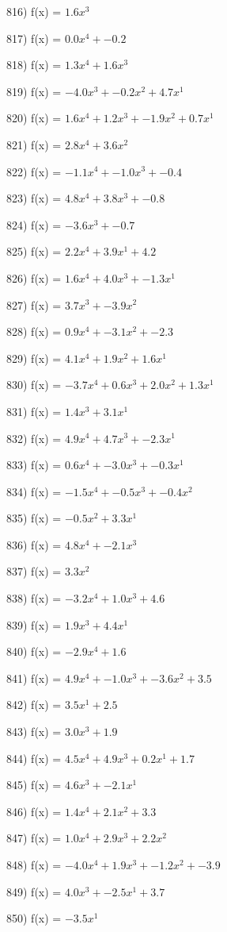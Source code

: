 \documentclass[10pt,a4paper]{article}
\begin{document}
816) f(x) = $1.6x^3$

817) f(x) = $0.0x^4 + -0.2$

818) f(x) = $1.3x^4 + 1.6x^3$

819) f(x) = $-4.0x^3 + -0.2x^2 + 4.7x^1$

820) f(x) = $1.6x^4 + 1.2x^3 + -1.9x^2 + 0.7x^1$

821) f(x) = $2.8x^4 + 3.6x^2$

822) f(x) = $-1.1x^4 + -1.0x^3 + -0.4$

823) f(x) = $4.8x^4 + 3.8x^3 + -0.8$

824) f(x) = $-3.6x^3 + -0.7$

825) f(x) = $2.2x^4 + 3.9x^1 + 4.2$

826) f(x) = $1.6x^4 + 4.0x^3 + -1.3x^1$

827) f(x) = $3.7x^3 + -3.9x^2$

828) f(x) = $0.9x^4 + -3.1x^2 + -2.3$

829) f(x) = $4.1x^4 + 1.9x^2 + 1.6x^1$

830) f(x) = $-3.7x^4 + 0.6x^3 + 2.0x^2 + 1.3x^1$

831) f(x) = $1.4x^3 + 3.1x^1$

832) f(x) = $4.9x^4 + 4.7x^3 + -2.3x^1$

833) f(x) = $0.6x^4 + -3.0x^3 + -0.3x^1$

834) f(x) = $-1.5x^4 + -0.5x^3 + -0.4x^2$

835) f(x) = $-0.5x^2 + 3.3x^1$

836) f(x) = $4.8x^4 + -2.1x^3$

837) f(x) = $3.3x^2$

838) f(x) = $-3.2x^4 + 1.0x^3 + 4.6$

839) f(x) = $1.9x^3 + 4.4x^1$

840) f(x) = $-2.9x^4 + 1.6$

841) f(x) = $4.9x^4 + -1.0x^3 + -3.6x^2 + 3.5$

842) f(x) = $3.5x^1 + 2.5$

843) f(x) = $3.0x^3 + 1.9$

844) f(x) = $4.5x^4 + 4.9x^3 + 0.2x^1 + 1.7$

845) f(x) = $4.6x^3 + -2.1x^1$

846) f(x) = $1.4x^4 + 2.1x^2 + 3.3$

847) f(x) = $1.0x^4 + 2.9x^3 + 2.2x^2$

848) f(x) = $-4.0x^4 + 1.9x^3 + -1.2x^2 + -3.9$

849) f(x) = $4.0x^3 + -2.5x^1 + 3.7$

850) f(x) = $-3.5x^1$
\end{document}
